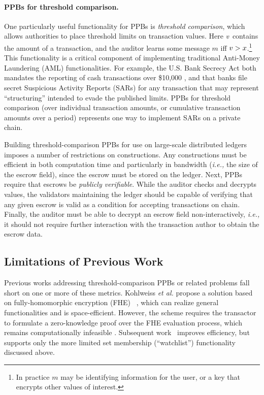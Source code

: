 \paragraph{PPBs for threshold comparison.}
One particularly useful functionality for PPBs is  \emph{threshold comparison}, which allows authorities to place threshold limits on transaction values.
Here $v$ contains the amount of a transaction, and the auditor learns some message $m$ iff $v > x$.\footnote{In practice $m$ may be identifying information for the user, or a key that encrypts other values of interest.}
This functionality is a critical component of implementing traditional Anti-Money Laundering (AML) functionalities.
For example, the U.S. Bank Secrecy Act both mandates the reporting of cash transactions over \$10,000 \cite{meltzer1991keeping}, and that banks file secret Suspicious Activity Reports (SARs) for any transaction  that may represent ``structuring'' intended to evade the published limits.
PPBs for threshold comparison (over individual transaction amounts, or cumulative transaction amounts over a period) represents one way to implement SARs on a private chain.

Building threshold-comparison PPBs for use on large-scale distributed ledgers imposes a number of restrictions on  constructions.
Any constructions must be efficient in both computation time and particularly in bandwidth (\emph{i.e.,} the size of the escrow field), since the escrow must be stored on the ledger.
Next, PPBs require that escrows be \emph{publicly verifiable}.
While the auditor checks and decrypts values, the validators maintaining the ledger should be capable of verifying that any given escrow is valid as a condition for accepting transactions on chain.
Finally, the auditor must be able to decrypt an escrow field non-interactively, {\em i.e.,} it should not require further interaction with the transaction author to obtain the escrow data.

\subsection{Limitations of Previous Work}
Previous works addressing threshold-comparison PPBs or related problems fall short on one or more of these metrics.
Kohlweiss \emph{et al.} propose a solution based on fully-homomorphic encryption (FHE)~ \cite{EC:KohLysNgu23}, which can realize general functionalities and is space-efficient.
However, the scheme requires the transactor to formulate a zero-knowledge proof over the FHE evaluation process, which remains computationally infeasible \cite{viand2023verifiable}.
Subsequent work~\cite{EPRINT:GKLS24} improves efficiency, but supports only the more limited set membership (``watchlist'') functionality discussed above.

